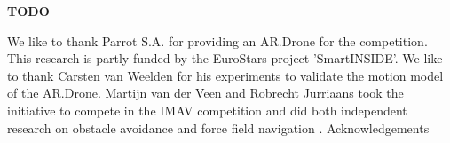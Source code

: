 \textbf{TODO}

We like to thank Parrot S.A. for providing an AR.Drone for the competition. This research is partly funded by the EuroStars project 'SmartINSIDE'. We like to thank Carsten van Weelden for his experiments to validate the motion model of the AR.Drone. Martijn van der Veen and Robrecht Jurriaans took the initiative to compete in the IMAV competition and did both independent research on obstacle avoidance \cite{Jurriaans2011} and force field navigation \cite{VanDerVeen2011}. Acknowledgements